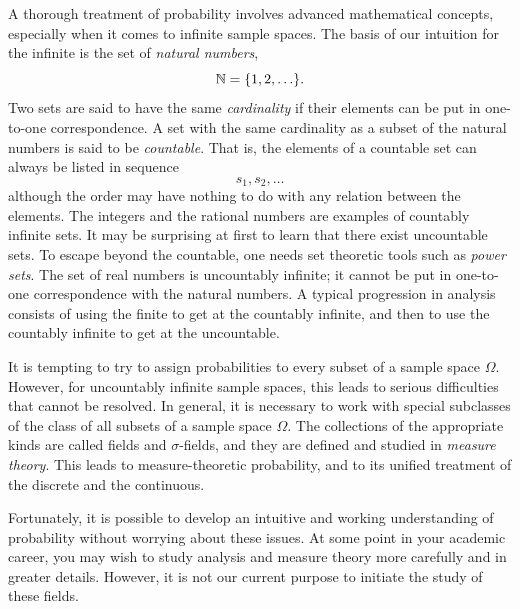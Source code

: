 A thorough treatment of probability involves advanced mathematical concepts, especially when it comes to infinite sample spaces.
The basis of our intuition for the infinite is the set of \emph{natural numbers},
\begin{equation*}
\mathbb{N} = \{ 1, 2, \ldots \}.
\end{equation*}
Two sets are said to have the same \emph{cardinality} if their elements can be put in one-to-one correspondence.
A set with the same cardinality as a subset of the natural numbers is said to be \emph{countable}.
That is, the elements of a countable set can always be listed in sequence
\begin{equation*}
s_1, s_2, \ldots
\end{equation*}
although the order may have nothing to do with any relation between the elements.
The integers and the rational numbers are examples of countably infinite sets.
It may be surprising at first to learn that there exist uncountable sets.
To escape beyond the countable, one needs set theoretic tools such as \emph{power sets}.
The set of real numbers is uncountably infinite; it cannot be put in one-to-one correspondence with the natural numbers.
A typical progression in analysis consists of using the finite to get at the countably infinite, and then to use the countably infinite to get at the uncountable.

It is tempting to try to assign probabilities to every subset of a sample space $\Omega$.
However, for uncountably infinite sample spaces, this leads to serious difficulties that cannot be resolved.
In general, it is necessary to work with special subclasses of the class of all subsets of a sample space $\Omega$.
The collections of the appropriate kinds are called fields and $\sigma$-fields, and they are defined and studied in \emph{measure theory}.
This leads to measure-theoretic probability, and to its unified treatment of the discrete and the continuous.

Fortunately, it is possible to develop an intuitive and working understanding of probability without worrying about these issues.
At some point in your academic career, you may wish to study analysis and measure theory more carefully and in greater details.
However, it is not our current purpose to initiate the study of these fields.

